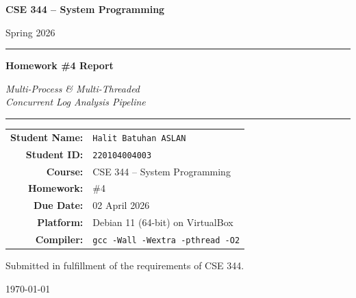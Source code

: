 \documentclass[11pt,a4paper]{article}
\newcommand{\code}[1]{\texttt{\small #1}}
\begin{document}
\begin{titlepage}
\centering
\vspace*{2cm}

{\Huge\bfseries\color{primary} CSE 344 -- System Programming \par}
\vspace{0.4cm}
{\Large Spring 2026 \par}

\vspace{2.5cm}
\rule{\textwidth}{1pt}
\vspace{0.5cm}

{\huge\bfseries Homework \#4 Report \par}
\vspace{0.6cm}
{\LARGE\itshape Multi-Process \& Multi-Threaded\\
Concurrent Log Analysis Pipeline \par}

\vspace{0.5cm}
\rule{\textwidth}{1pt}

\vspace{3cm}

\begin{tabular}{rl}
\textbf{Student Name:} & \texttt{Halit Batuhan ASLAN} \\[6pt]
\textbf{Student ID:}   & \texttt{220104004003} \\[6pt]
\textbf{Course:}       & CSE 344 -- System Programming \\[6pt]
\textbf{Homework:}     & \#4 \\[6pt]
\textbf{Due Date:}     & 02 April 2026 \\[6pt]
\textbf{Platform:}     & Debian 11 (64-bit) on VirtualBox \\[6pt]
\textbf{Compiler:}     & \code{gcc -Wall -Wextra -pthread -O2} \\
\end{tabular}

\vfill

{\large Submitted in fulfillment of the requirements of CSE 344. \par}
\vspace{0.5cm}
{\small \today \par}

\end{titlepage}

\setcounter{page}{1}
\tableofcontents
\thispagestyle{fancy}
\newpage
\end{document}
